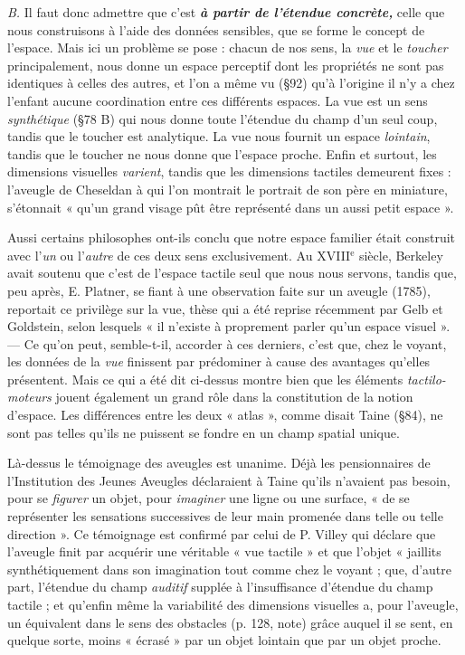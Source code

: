 {\it B.} Il faut donc admettre que c’est \textbf{\textit {à partir de l'étendue concrète,}}
celle que nous construisons à l’aide des données sensibles, que se
forme le concept de l’espace. Mais ici un problème se pose : chacun de
nos sens, la {\it vue} et le {\it toucher} principalement, nous donne un espace
perceptif dont les propriétés ne sont pas identiques à celles des autres,
et l’on a même vu (\S 92) qu’à l’origine il n’y a chez l’enfant aucune
coordination entre ces différents espaces. La vue est un sens {\it synthétique}
(\S 78 B) qui nous donne toute l'étendue du champ d’un seul
coup, tandis que le toucher est analytique. La vue nous fournit un
espace {\it lointain}, tandis que le toucher ne nous donne que l’espace
proche. Enfin et surtout, les dimensions visuelles {\it varient}, tandis que
les dimensions tactiles demeurent fixes : l’aveugle de Cheseldan à
qui l’on montrait le portrait de son père en miniature, s’étonnait
« qu’un grand visage pût être représenté dans un aussi petit espace ».

Aussi certains philosophes ont-ils conclu que notre espace familier
était construit avec l’{\it un} ou l’{\it autre} de ces deux sens exclusivement.
Au {\footnotesize XVIII}$^\text{e}$ siècle, Berkeley avait soutenu que c’est de l’espace tactile
seul que nous nous servons, tandis que, peu après, E. Platner, se
fiant à une observation faite sur un aveugle (1785), reportait ce privilège
sur la vue, thèse qui a été reprise récemment par Gelb et
Goldstein, selon lesquels « il n’existe à proprement parler qu’un
espace visuel ». — Ce qu’on peut, semble-t-il, accorder à ces derniers,
c’est que, chez le voyant, les données de la {\it vue} finissent par prédominer
à cause des avantages qu’elles présentent. Mais ce qui a été dit ci-dessus
montre bien que les éléments {\it tactilo-moteurs} jouent également
un grand rôle dans la constitution de la notion d'espace. Les différences
entre les deux « atlas », comme disait Taine (\S 84), ne sont pas
telles qu’ils ne puissent se fondre en un champ spatial unique.

\vspace{0.24cm}
{\footnotesize Là-dessus le témoignage des aveugles
est unanime. Déjà les pensionnaires
de l’Institution des Jeunes Aveugles déclaraient à Taine qu'ils n'avaient
pas besoin, pour se {\it figurer} un objet, pour {\it imaginer} une ligne ou une surface,
« de se représenter les sensations successives de leur main promenée dans
telle ou telle direction ». Ce témoignage est confirmé par celui de P. Villey
qui déclare que l’aveugle finit par acquérir une véritable « vue tactile » et
que l’objet « jaillits synthétiquement dans son imagination tout comme
chez le voyant ; que, d'autre part, l'étendue du champ {\it auditif} supplée à
l'insuffisance d’étendue du champ tactile ; et qu’enfin même la variabilité
des dimensions visuelles a, pour l’aveugle, un équivalent dans le sens des
obstacles (p. 128, note) grâce auquel il se sent, en quelque sorte, moins
« écrasé » par un objet lointain que par un objet proche.}
\vspace{0.31cm}

